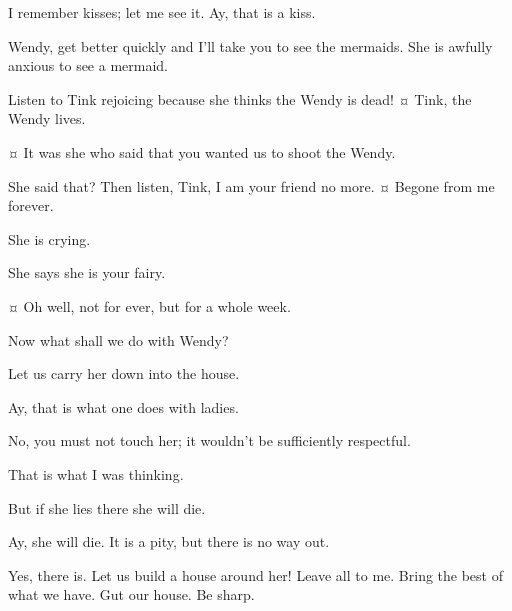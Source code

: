 \begin{drama}
\slightlyspeaks
I remember kisses; let me see it.
Ay, that is a kiss.

\peterspeaks
Wendy, get better quickly and I'll take you to see the mermaids.
She is awfully anxious to see a mermaid.


\curlyspeaks
Listen to Tink rejoicing because she thinks the Wendy is dead!
¤
Tink, the Wendy lives.


\secondtwinspeaks {}¤
It was she who said that you wanted us to shoot the Wendy.

\peterspeaks
She said that?
Then listen, Tink, I am your friend no more.
¤
Begone from me forever.

\curlyspeaks
She is crying.

\tootlesspeaks
She says she is your fairy.

\peterspeaks {}¤
Oh well, not for ever, but for a whole week.


\speakercontinues
Now what shall we do with Wendy?

\curlyspeaks
Let us carry her down into the house.

\slightlyspeaks
Ay, that is what one does with ladies.

\peterspeaks
No, you must not touch her; it wouldn't be sufficiently respectful.

\slightlyspeaks
That is what I was thinking.

\tootlesspeaks
But if she lies there she will die.

\slightlyspeaks
Ay, she will die.
It is a pity, but there is no way out.

\peterspeaks
Yes, there is.
Let us build a house around her!
Leave all to me.
Bring the best of what we have.
Gut our house.
Be sharp.


\end{drama}
